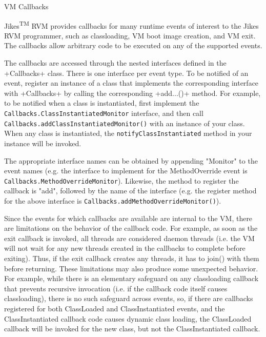 \begin{section}{VM Callbacks}
\label{sec:vmcallbacks}

Jikes\textsuperscript{TM} RVM provides callbacks for many runtime events of interest to the Jikes RVM programmer, such as classloading, VM boot image creation, and VM exit. The callbacks allow arbitrary code to be executed on any of the supported events.

The callbacks are accessed through the nested interfaces defined in the \spverb+Callbacks+ class. There is one interface per event type. To be notified of an event, register an instance of a class that implements the corresponding interface with \spverb+Callbacks+ by calling the corresponding \spverb+add...()+ method. For example, to be notified when a class is instantiated, first implement the \texttt{Call\-backs.Class\-In\-stan\-tia\-ted\-Mo\-ni\-tor} interface, and then call \texttt{Call\-backs.add\-Class\-In\-stan\-tia\-ted\-Mo\-ni\-tor()} with an instance of your class. When any class is instantiated, the \texttt{no\-ti\-fy\-Class\-In\-stan\-tia\-ted} method in your instance will be invoked.

The appropriate interface names can be obtained by appending "Monitor" to the event names (e.g. the interface to implement for the MethodOverride event is \texttt{Call\-backs.Me\-thod\-Over\-ri\-de\-Mo\-ni\-tor}). Likewise, the method to register the callback is "add", followed by the name of the interface (e.g. the register method for the above interface is \texttt{Call\-backs.add\-Me\-thod\-Over\-ri\-de\-Mo\-ni\-tor()}).

Since the events for which callbacks are available are internal to the VM, there are limitations on the behavior of the callback code. For example, as soon as the exit callback is invoked, all threads are considered daemon threads (i.e. the VM will not wait for any new threads created in the callbacks to complete before exiting). Thus, if the exit callback creates any threads, it has to join() with them before returning. These limitations may also produce some unexpected behavior. For example, while there is an elementary safeguard on any classloading callback that prevents recursive invocation (i.e. if the callback code itself causes classloading), there is no such safeguard across events, so, if there are callbacks registered for both ClassLoaded and ClassInstantiated events, and the ClassInstantiated callback code causes dynamic class loading, the ClassLoaded callback will be invoked for the new class, but not the ClassInstantiated callback.


\end{section}
